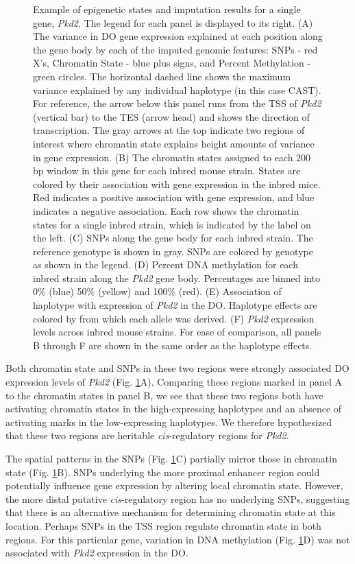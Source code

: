 \documentclass[
  11pt,
]{article}
\begin{document}
\begin{figure}[ht!]
\caption{Example of epigenetic states and imputation results for a single 
gene, \textit{Pkd2}. The legend for each panel is displayed to its right.
(A) The variance in DO gene expression explained at 
each position along the gene body by each of the imputed genomic 
features: SNPs - red X's, Chromatin State - blue plus signs, and 
Percent Methylation - green circles. The horizontal 
dashed line shows the maximum variance explained by any individual 
haplotype (in this case CAST). For reference, the arrow below 
this panel runs from the TSS of \textit{Pkd2} (vertical bar) to the 
TES (arrow head) and shows the direction of transcription. The 
gray arrows at the top indicate two regions of interest where 
chromatin state explains height amounts of variance in gene expression. 
(B) The chromatin states assigned to each 200 bp window in this gene 
for each inbred mouse strain. States are colored by their association 
with gene expression in the inbred mice. Red indicates a positive 
association with gene expression, and blue indicates a negative 
association. Each row shows the chromatin states for a single inbred 
strain, which is indicated by the label on the left. (C) SNPs along 
the gene body for each inbred strain. The reference genotype is shown 
in gray. SNPs are colored by genotype as shown in the legend. (D) Percent 
DNA methylation for each inbred strain along the \textit{Pkd2} gene body. 
Percentages are binned into 0\% (blue) 50\% (yellow) and 100\% (red). (E) 
Association of haplotype with expression of \textit{Pkd2} in the DO. Haplotype 
effects are colored by from which each allele was derived. (F) \textit{Pkd2} 
expression levels across inbred mouse strains. For ease of comparison, 
all panels B through F are shown in the same order as the haplotype effects.}
\label{fig:example_gene}
\end{figure}

Both chromatin state and SNPs in these two regions were strongly
associated DO expression levels of \textit{Pkd2} (Fig.
\ref{fig:example_gene}A). Comparing these regions marked in panel A to
the chromatin states in panel B, we see that these two regions both have
activating chromatin states in the high-expressing haplotypes and an
absence of activating marks in the low-expressing haplotypes. We
therefore hypothesized that these two regions are heritable
\textit{cis}-regulatory regions for \textit{Pkd2}.

The spatial patterns in the SNPs (Fig. \ref{fig:example_gene}C)
partially mirror those in chromatin state (Fig.
\ref{fig:example_gene}B). SNPs underlying the more proximal enhancer
region could potentially influence gene expression by altering local
chromatin state. However, the more distal putative
\textit{cis}-regulatory region has no underlying SNPs, suggesting that
there is an alternative mechanism for determining chromatin state at
this location. Perhaps SNPs in the TSS region regulate chromatin state
in both regions. For this particular gene, variation in DNA methylation
(Fig. \ref{fig:example_gene}D) was not associated with \textit{Pkd2}
expression in the DO.
\end{document}
